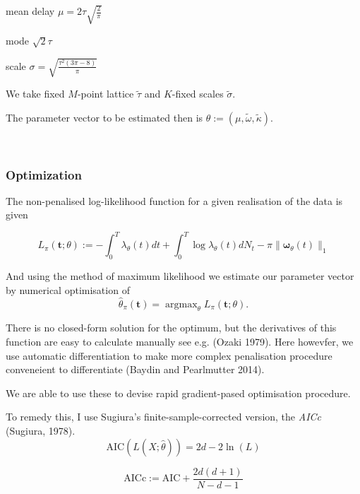 \documentclass[11pt]{article}
\begin{document}
    mean delay $\mu=2\tau \sqrt{\frac{2}{\pi}}$

mode $\sqrt{2}\tau$

scale $\sigma=\sqrt{\frac{\tau^2(3 \pi - 8)}{\pi}}$

We take fixed $M$-point lattice $\tilde{\tau}$ and $K$-fixed scales
$\tilde{\sigma}.$

The parameter vector to be estimated then is
$\theta:=(\mu, \tilde{\omega}, \tilde{\kappa}).$



    \begin{center}
    \end{center}
    { \hspace*{\fill} \\}
    
    \subsubsection{Optimization}\label{optimization}

The non-penalised log-likelihood function for a given realisation of the
data is given

\[L_\pi(\mathbf t;\theta):=-\int_0^T\lambda_\theta(t)dt + \int_0^T\log \lambda_\theta(t) dN_t - \pi\|\boldsymbol \omega_\theta(t)\|_1\]

And using the method of maximum likelihood we estimate our parameter
vector by numerical optimisation of
\[\hat{\theta}_\pi(\mathbf t) = \operatorname{argmax}_\theta L_\pi(\mathbf t;\theta).\]

There is no closed-form solution for the optimum, but the derivatives of
this function are easy to calculate manually see e.g. (Ozaki 1979). Here
howevfer, we use automatic differentiation to make more complex
penalisation procedure conveneient to differentiate (Baydin and
Pearlmutter 2014).

We are able to use these to devise rapid gradient-pased optimisation
procedure.

    To remedy this, I use Sugiura's finite-sample-corrected version, the
\emph{AICc} (Sugiura, 1978).
\[{\mathrm {AIC}(L(X;\hat{\theta}))}=2d-2\ln(L)\]

\[{\mathrm {AICc}}:={\mathrm {AIC}}+{\frac {2d(d+1)}{N-d-1}}\]



    \begin{center}
    \end{center}
    { \hspace*{\fill} \\}
    
\end{document}
